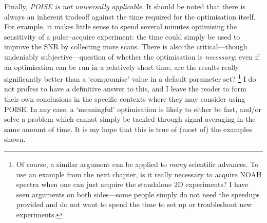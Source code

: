Finally, \textit{POISE is not universally applicable}.
It should be noted that there is always an inherent tradeoff against the time required for the optimisation itself.
For example, it makes little sense to spend several minutes optimising the sensitivity of a pulse--acquire experiment: the time could simply be used to improve the SNR by collecting more scans.
There is also the critical---though undeniably subjective---question of whether the optimisation is \textit{necessary}: even if an optimisation can be run in a relatively short time, are the results really significantly better than a `compromise' value in a default parameter set?%
\footnote{Of course, a similar argument can be applied to \textit{many} scientific advances. To use an example from the next chapter, is it really necessary to acquire NOAH spectra when one can just acquire the standalone 2D experiments? I have seen arguments on both sides---some people simply do not need the speedups provided and do not want to spend the time to set up or troubleshoot new experiments.}
I do not profess to have a definitive answer to this, and I leave the reader to form their own conclusions in the specific contexts where they may consider using POISE.
In any case, a `meaningful' optimisation is likely to either be fast, and/or solve a problem which cannot simply be tackled through signal averaging in the same amount of time.
It is my hope that this is true of (most of) the examples shown.
